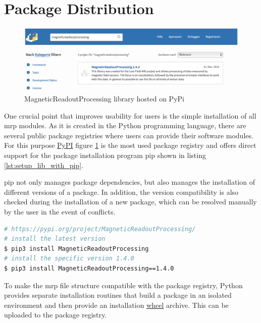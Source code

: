 \newpage

\hypertarget{package-distribution}{%
\section{Package Distribution}\label{package-distribution}}

\begin{figure}
\centering
\includegraphics{./generated_images/border_MagneticReadoutProcessing_library_hosted_on_PyPi.png}
\caption{MagneticReadoutProcessing library hosted on PyPi
\label{MagneticReadoutProcessing_library_hosted_on_PyPi.png}}
\end{figure}

One crucial point that improves usability for users is the simple
installation of all \gls{mrp} modules. As it is created in the Python
programming language, there are several public package registries where
users can provide their software modules. For this purpose
\href{https://pypi.org}{PyPI} figure
\ref{MagneticReadoutProcessing_library_hosted_on_PyPi.png} is the most
used package registry and offers direct support for the package
installation program \gls{pip} shown in listing
\ref{lst:setup_lib_with_pip}.

\gls{pip} not only manages package dependencies, but also manages the
installation of different versions of a package. In addition, the
version compatibility is also checked during the installation of a new
package, which can be resolved manually by the user in the event of
conflicts.

\begin{lstlisting}[language=bash, caption={Bash commands to install the MagneticReadoutProcessing library using pip}, label=lst:setup_lib_with_pip]
# https://pypi.org/project/MagneticReadoutProcessing/
# install the latest version
$ pip3 install MagneticReadoutProcessing
# install the specific version 1.4.0
$ pip3 install MagneticReadoutProcessing==1.4.0
\end{lstlisting}

To make the \gls{mrp} file structure compatible with the package
registry, Python provides separate installation routines that build a
package in an isolated environment and then provide an installation
\href{https://peps.python.org/pep-0427/}{wheel} archive. This can be
uploaded to the package registry.

